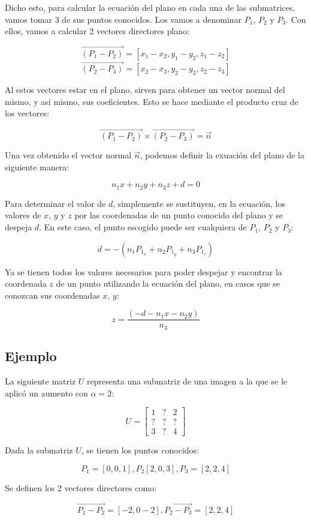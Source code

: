 \documentclass[12pt,a4paper]{article}
\begin{document}
Dicho esto, para calcular la ecuación del plano en cada una de las submatrices, vamos tomar 3 de sus puntos conocidos. Los vamos a denominar $P_1$, $P_2$ y $P_3$. Con ellos, vamos a calcular 2 vectores directores plano:

\[
\vec{(P_1 - P_2)} = [x_1 - x_2, y_1 - y_2, z_1 - z_2]
\]
\[
\vec{(P_2 - P_3)} = [x_2 - x_3, y_2 - y_3, z_2 - z_3]
\]

Al estos vectores estar en el plano, sirven para obtener un vector normal del mismo, y así mismo, sus coeficientes. Esto se hace mediante el producto cruz de los vectores:

\[
\vec{(P_1 - P_2)} \times \vec{(P_2 - P_3)} = \vec{n}
\]

Una vez obtenido el vector normal $\vec{n}$, podemos definir la exuación del plano de la siguiente manera:

\[
n_1x + n_2y + n_3z + d = 0
\]

Para determinar el valor de $d$, simplemente se sustituyen, en la ecuación, los valores de $x$, $y$ y $z$ por las coordenadas de un punto conocido del plano y se despeja $d$. En este caso, el punto escogido puede ser cualquiera de $P_1$, $P_2$ y $P_3$:

\[
d = -(n_1P_{1_x} + n_2P_{1_y} + n_3P_{1_z})
\]

Ya se tienen todos los valores necesarios para poder despejar y encontrar la coordenada $z$ de un punto utilizando la ecuación del plano, en casos que se conozcan sus coordenadas $x$, $y$: 

\[
z = \frac{(-d - n_1x - n_2y)}{n_3}
\]

\subsection{Ejemplo}

La siguiente matriz $U$ representa una submatriz de una imagen a la que se le aplicó un aumento con $\alpha = 2$:

\[
U =
    \begin{bmatrix}
    1 & ? & 2 \\
    ? & ? & ? \\
    3 & ? & 4
    \end{bmatrix}
\]

Dada la submatriz $U$, se tienen los puntos conocidos:

\[
P_1 = [0,0,1], P_2 [2,0,3], P_3 = [2,2,4]
\]

Se definen los 2 vectores directores como:

\[
\vec{P_1 - P_2} = [-2,0-2], \vec{P_2 - P_3} = [2,2,4]
\]
\end{document}
